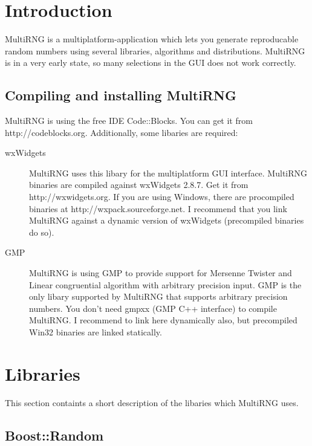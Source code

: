 \documentclass{scrartcl}
\begin{document}
\section{Introduction}
MultiRNG is a multiplatform-application which lets you generate reproducable random numbers using several libraries, algorithms and distributions.\newline
MultiRNG is in a very early state, so many selections in the GUI does not work correctly.
\subsection{Compiling and installing MultiRNG}
MultiRNG is using the free IDE Code::Blocks. You can get it from http://codeblocks.org.
Additionally, some libaries are required:
\begin{description}
\item[wxWidgets]MultiRNG uses this libary for the multiplatform GUI interface. MultiRNG binaries are compiled against wxWidgets 2.8.7. Get it from http://wxwidgets.org. If you are using Windows, there are procompiled binaries at http://wxpack.sourceforge.net. I recommend that you link MultiRNG against a dynamic version of wxWidgets (precompiled binaries do so).
\item[GMP]MultiRNG is using GMP to provide support for Mersenne Twister and Linear congruential algorithm with arbitrary precision input. GMP is the only libary supported by MultiRNG that supports arbitrary precision numbers. You don't need gmpxx (GMP C++ interface) to compile MultiRNG. I recommend to link here dynamically also, but precompiled Win32 binaries are linked statically. 
\end{description}
\section{Libraries}
This section containts a short description of the libaries which MultiRNG uses.
\subsection{Boost::Random}
\end{document}
